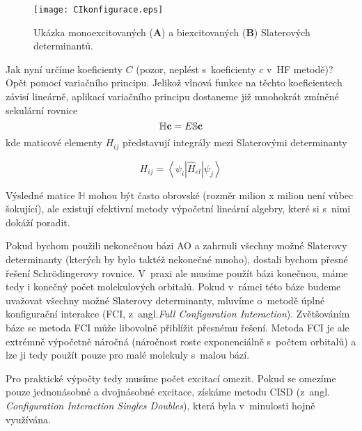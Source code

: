 \begin{figure} [htb]
\centering
\texttt{[image: CIkonfigurace.eps]}
\caption[Excitované Slaterovy determinanty]{Ukázka monoexcitovaných (\textbf{A}) a biexcitovaných (\textbf{B}) Slaterových determinantů.}
\label{obr:abinitio:ci}
\end{figure}

Jak nyní určíme koeficienty $C$ (pozor, neplést s~koeficienty $c$ v~HF metodě)? Opět pomocí variačního principu. Jelikož vlnová funkce na těchto koeficientech závisí lineárně, aplikací variačního principu dostaneme již mnohokrát zmíněné sekulární rovnice
\begin{equation}
\mathbb{H}\mathbf{c}=E\mathbb{S}\mathbf{c} \nonumber \\
\end{equation}
kde maticové elementy $H_{ij}$ představují integrály mezi Slaterovými determinanty

\begin{equation}
H_{ij}= \left\langle \psi_i | \hat{H}_{el} | \psi_j \right\rangle
\end{equation}

Výsledné matice $\mathbb{H}$ mohou být často obrovské (rozměr milion x milion není vůbec šokující), ale existují efektivní metody výpočetní lineární algebry, které si s~nimi dokáží poradit.

Pokud bychom použili nekonečnou bázi AO a zahrnuli všechny možné Slaterovy determinanty (kterých by bylo taktéž nekonečné mnoho), dostali bychom přesné řešení Schr\"{o}dingerovy rovnice. V~praxi ale musíme použít bázi konečnou, máme tedy i konečný počet molekulových orbitalů. Pokud v~rámci této báze budeme uvažovat všechny možné Slaterovy determinanty, mluvíme o~metodě úplné konfigurační interakce (FCI, z~angl.\textit{Full Configuration Interaction}). Zvětšováním báze se metoda FCI může libovolně přiblížit přesnému řešení. Metoda FCI je ale extrémně výpočetně náročná (náročnost roste exponenciálně s~počtem orbitalů) a lze ji tedy použít pouze pro malé molekuly s~malou bází.

Pro praktické výpočty tedy musíme počet excitací omezit. Pokud se omezíme pouze jednonásobné a dvojnásobné excitace, získáme metodu CISD (z~angl. \textit{Configuration Interaction Singles Doubles}), která byla v~minulosti hojně využívána.

